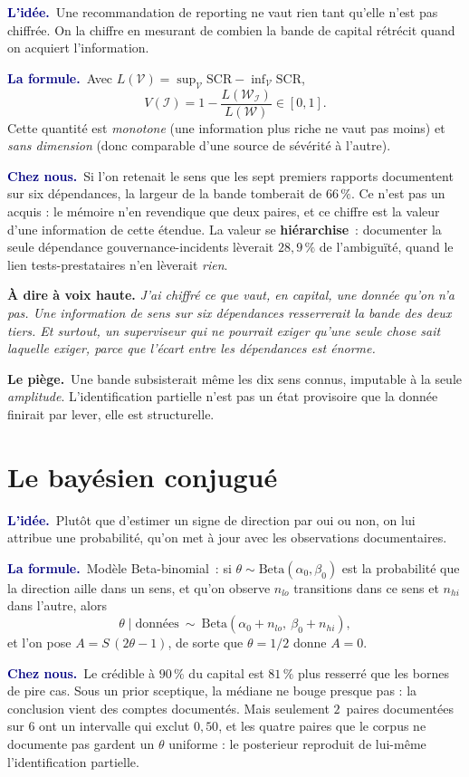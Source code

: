 \documentclass[11pt,a4paper]{article}
\newcommand{\lidee}[1]{\smallskip\noindent\textcolor{navy}{\textbf{L'idée.}}\ #1\par}
\newcommand{\laformule}[1]{\smallskip\noindent\textcolor{navy}{\textbf{La formule.}}\ #1\par}
\newcommand{\cheznous}[1]{\smallskip\noindent\textcolor{navy}{\textbf{Chez nous.}}\ #1\par}
\newcommand{\lepiege}[1]{\smallskip\noindent\textcolor{accent}{\textbf{Le piège.}}\ #1\par}
\newcommand{\laphrase}[1]{\begin{phrasebox}\textbf{À dire à voix haute.} \emph{#1}\end{phrasebox}}
\begin{document}
\lidee{Une recommandation de reporting ne vaut rien tant qu'elle n'est pas chiffrée. On la
chiffre en mesurant de combien la bande de capital rétrécit quand on acquiert
l'information.}

\laformule{Avec $L(\mathcal{V})=\sup_{\mathcal{V}}\mathrm{SCR}-\inf_{\mathcal{V}}\mathrm{SCR}$,
\[
  V(\mathcal{I}) = 1-\frac{L(\mathcal{W}_{\mathcal{I}})}{L(\mathcal{W})} \in[0,1].
\]
Cette quantité est \emph{monotone} (une information plus riche ne vaut pas moins) et
\emph{sans dimension} (donc comparable d'une source de sévérité à l'autre).}

\cheznous{Si l'on retenait le sens que les sept premiers rapports documentent sur six
dépendances, la largeur de la bande tomberait de $66\,\%$. Ce n'est pas un acquis : le mémoire
n'en revendique que deux paires, et ce chiffre est la valeur d'une information de cette étendue.
La valeur se \textbf{hiérarchise}~: documenter la seule dépendance gouvernance-incidents lèverait
$28{,}9\,\%$ de l'ambiguïté, quand le lien tests-prestataires n'en lèverait \emph{rien}.}

\laphrase{J'ai chiffré ce que vaut, en capital, une donnée qu'on n'a pas. Une information de sens
sur six dépendances resserrerait la bande des deux tiers. Et surtout, un superviseur qui ne
pourrait exiger qu'une seule chose sait laquelle exiger, parce que l'écart entre les dépendances
est énorme.}

\lepiege{Une bande subsisterait même les dix sens connus, imputable à la seule
\emph{amplitude}. L'identification partielle n'est pas un état provisoire que la donnée
finirait par lever, elle est structurelle.}

\section{Le bayésien conjugué}

\lidee{Plutôt que d'estimer un signe de direction par oui ou non, on lui attribue une
probabilité, qu'on met à jour avec les observations documentaires.}

\laformule{Modèle Beta-binomial~: si $\theta\sim\mathrm{Beta}(\alpha_0,\beta_0)$ est la
probabilité que la direction aille dans un sens, et qu'on observe $n_{lo}$ transitions dans
ce sens et $n_{hi}$ dans l'autre, alors
\[
  \theta \mid \text{données} \ \sim\ \mathrm{Beta}(\alpha_0+n_{lo},\ \beta_0+n_{hi}),
\]
et l'on pose $A = S\,(2\theta-1)$, de sorte que $\theta=1/2$ donne $A=0$.}

\cheznous{Le crédible à $90\,\%$ du capital est $81\,\%$ plus resserré que les bornes de pire
cas. Sous un prior sceptique, la médiane ne bouge presque pas : la conclusion vient des comptes
documentés. Mais seulement $2$~paires documentées sur $6$ ont un intervalle qui exclut $0{,}50$, et
les quatre paires que le corpus ne documente pas gardent un $\theta$ uniforme : le posterieur
reproduit de lui-même l'identification partielle.}
\end{document}
